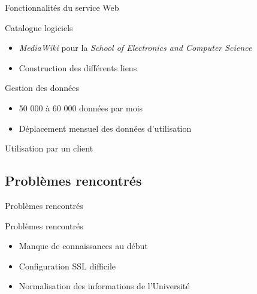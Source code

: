 	
\begin{frame}{Fonctionnalit\'es du service Web}
	\begin{block}{Catalogue logiciels}
		\begin{itemize}
			\item \textit{MediaWiki} pour la \textit{School of Electronics and Computer Science}
			\item Construction des diff\'erents liens
			
		\end{itemize}

	\end{block}
	
	\begin{block}{Gestion des donn\'ees}
		\begin{itemize}
			\item 50 000 \`a 60 000 donn\'ees par mois
			\item D\'eplacement mensuel des donn\'ees d'utilisation
			
		\end{itemize}

	\end{block}

\end{frame}


\begin{frame}{Utilisation par un client}
	\begin{figure}[h]
		\centering
		\qquad

	\end{figure}
	
\end{frame}


\subsection{Probl\`emes rencontr\'es}
	
\begin{frame}{Probl\`emes rencontr\'es}
	\begin{block}{Probl\`emes rencontr\'es}
		\begin{itemize}
			\item Manque de connaissances au d\'ebut
			\item Configuration SSL difficile
			\item Normalisation des informations de l'Universit\'e
			
		\end{itemize}

	\end{block}
	
\end{frame}


